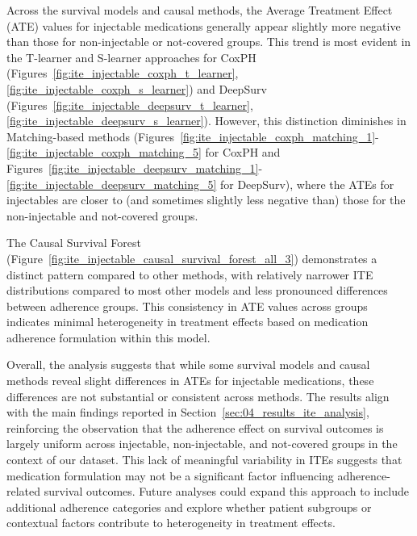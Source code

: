 Across the survival models and causal methods, the Average Treatment Effect (ATE) values for injectable medications generally appear slightly more negative than those for non-injectable or not-covered groups.
This trend is most evident in the T-learner and S-learner approaches for CoxPH (Figures~\ref{fig:ite_injectable_coxph_t_learner}, \ref{fig:ite_injectable_coxph_s_learner}) and DeepSurv (Figures~\ref{fig:ite_injectable_deepsurv_t_learner}, \ref{fig:ite_injectable_deepsurv_s_learner}).
However, this distinction diminishes in Matching-based methods (Figures~\ref{fig:ite_injectable_coxph_matching_1}-\ref{fig:ite_injectable_coxph_matching_5} for CoxPH and Figures~\ref{fig:ite_injectable_deepsurv_matching_1}-\ref{fig:ite_injectable_deepsurv_matching_5} for DeepSurv), where the ATEs for injectables are closer to (and sometimes slightly less negative than) those for the non-injectable and not-covered groups.

The Causal Survival Forest (Figure~\ref{fig:ite_injectable_causal_survival_forest_all_3}) demonstrates a distinct pattern compared to other methods, with relatively narrower ITE distributions compared to most other models and less pronounced differences between adherence groups.
This consistency in ATE values across groups indicates minimal heterogeneity in treatment effects based on medication adherence formulation within this model.

Overall, the analysis suggests that while some survival models and causal methods reveal slight differences in ATEs for injectable medications, these differences are not substantial or consistent across methods.
The results align with the main findings reported in Section~\ref{sec:04_results_ite_analysis}, reinforcing the observation that the adherence effect on survival outcomes is largely uniform across injectable, non-injectable, and not-covered groups in the context of our dataset.
This lack of meaningful variability in ITEs suggests that medication formulation may not be a significant factor influencing adherence-related survival outcomes.
Future analyses could expand this approach to include additional adherence categories and explore whether patient subgroups or contextual factors contribute to heterogeneity in treatment effects.